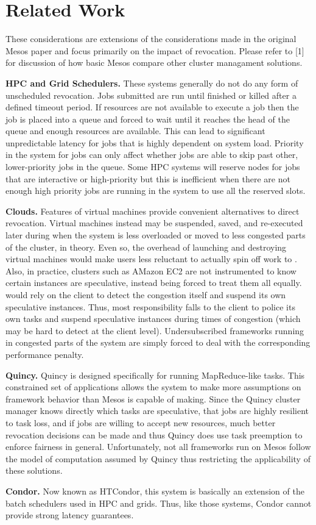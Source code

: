 \section{Related Work}
These considerations are extensions of the considerations made in the original Mesos paper and
focus primarily on the impact of revocation. Please refer to [1] for discussion of how basic
Mesos compare other cluster managament solutions.

\textbf{HPC and Grid Schedulers.} These systems generally do not do any form of unscheduled
revocation. Jobs submitted are run until finished or killed after a defined timeout period.
If resources are not available to execute a job then the job is placed into a queue and forced
to wait until it reaches the head of the queue and enough resources are available. This can
lead to significant unpredictable latency for jobs that is highly dependent on system load.
Priority in the system for jobs can only affect whether jobs are able to skip past other,
lower-priority jobs in the queue. Some HPC systems will reserve nodes for jobs that are
interactive or high-priority but this is inefficient when there are not enough high priority
jobs are running in the system to use all the reserved slots.

\textbf{Clouds.} Features of virtual machines provide convenient alternatives to direct
revocation. Virtual machines instead may be suspended, saved, and re-executed later during when
the system is less overloaded or moved to less congested parts of the cluster, in theory. Even
so, the overhead of launching and destroying virtual machines would make users less reluctant
to actually spin off work to . Also, in practice, clusters such as AMazon EC2 are not
instrumented to know certain instances are speculative, instead being forced to treat them all
equally.  would rely on the client to detect the congestion itself and suspend its own
speculative instances. Thus, most responsibility falls to the client to police its own tasks
and suspend speculative instances during times of congestion (which may be hard to detect at
the client level). Undersubscribed frameworks running in congested parts of the system are
simply forced to deal with the corresponding performance penalty.

\textbf{Quincy.} Quincy is designed specifically for running MapReduce-like tasks. This
constrained set of applications allows the system to make more assumptions on framework
behavior than Mesos is capable of making. Since the Quincy cluster manager knows directly which
tasks are speculative, that jobs are highly resilient to task loss, and if jobs are willing to
accept new resources, much better revocation decisions can be made and thus Quincy does use
task preemption to enforce fairness in general. Unfortunately, not all frameworks run on Mesos
follow the model of computation assumed by Quincy thus restricting the applicability of these
solutions.

\textbf{Condor.} Now known as HTCondor, this system is basically an extension of the batch
schedulers used in HPC and grids. Thus, like those systems, Condor cannot provide strong
latency guarantees.
